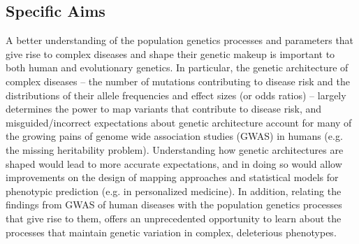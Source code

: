 \documentclass[11pt]{article}
\begin{document}
\setlength{\parskip}{\baselineskip}

\subsection*{Specific Aims}


A better understanding of the population genetics processes and parameters that give rise to complex diseases and shape their genetic makeup is important to both human and evolutionary genetics. In particular, the genetic architecture of complex diseases – the number of mutations contributing to disease risk and the distributions of their allele frequencies and effect sizes (or odds ratios) – largely determines the power to map variants that contribute to disease risk, and misguided/incorrect expectations about genetic architecture account for many of the growing pains of genome wide association studies (GWAS) in humans (e.g. the missing heritability problem). Understanding how genetic architectures are shaped would lead to more accurate expectations, and in doing so would allow improvements on the design of mapping approaches and statistical models for phenotypic prediction (e.g. in personalized medicine). In addition, relating the findings from GWAS of human diseases with the population genetics processes that give rise to them, offers an unprecedented opportunity to learn about the processes that maintain genetic variation in complex, deleterious phenotypes.  

\end{document}
